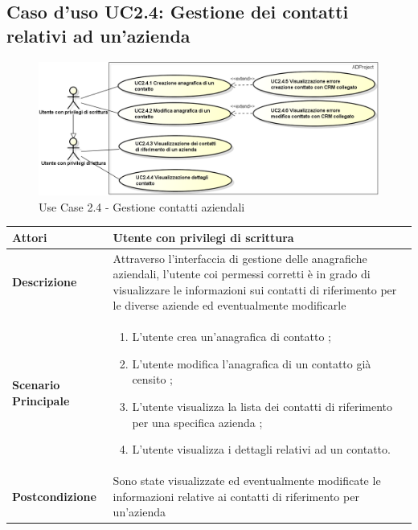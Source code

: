 	\hypertarget{UC2.4}{}
	\subsection{Caso d'uso UC2.4: Gestione dei contatti relativi ad un'azienda}
	\begin{figure}[H]
		\centering
		\includegraphics[scale=0.52]{images/useCase/UC2_4}
		\caption{Use Case 2.4 - Gestione contatti aziendali}
		\label{fig:uc2.4}
	\end{figure}
	\begin{longtable}{ | p{2.7cm} | p{12cm} |}
		\hline \textbf{Attori} & Utente con privilegi di scrittura\\ 
		\hline \textbf{Descrizione} & Attraverso l’interfaccia di gestione delle anagrafiche aziendali, l’utente coi permessi corretti è in grado di visualizzare le informazioni sui contatti di riferimento per le diverse aziende ed eventualmente modificarle\\ 
		\hline \textbf{Scenario Principale} & \begin{enumerate}
			\itemsep-0.5em 
			\item L’utente crea un’anagrafica di contatto ;
			\item L’utente modifica l’anagrafica di un contatto già censito ;
			\item L’utente visualizza la lista dei contatti di riferimento per una specifica azienda ;
			\item L’utente visualizza i dettagli relativi ad un contatto.
			
		\end{enumerate}
		\\ 
		\hline \textbf{Postcondizione} & Sono state visualizzate ed eventualmente modificate le informazioni relative ai contatti di riferimento per un’azienda\\ 
		\hline 
	\end{longtable}
	
	\hypertarget{UC3}{}
